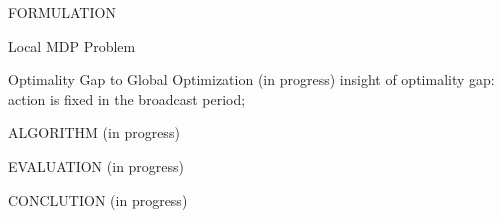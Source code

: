 \documentclass[10pt, conference, letterpaper]{IEEEtran}
\begin{document}
\begin{section}{FORMULATION}
\begin{subsection}{Local MDP Problem}
            \begin{subsubsection}{Optimality Gap to Global Optimization}
                (in progress)
                insight of optimality gap: action is fixed in the broadcast period;
            \end{subsubsection}
        \end{subsection}

    \end{section}

    \begin{section}{ALGORITHM}
        \label{sec:algorithm}
        (in progress)
    \end{section}

    \begin{section}{EVALUATION}
        \label{sec:ealuation}
        (in progress)
    \end{section}

    \begin{section}{CONCLUTION}
        \label{sec:conclusion}
        (in progress)
    \end{section}

    
    
\end{document}
